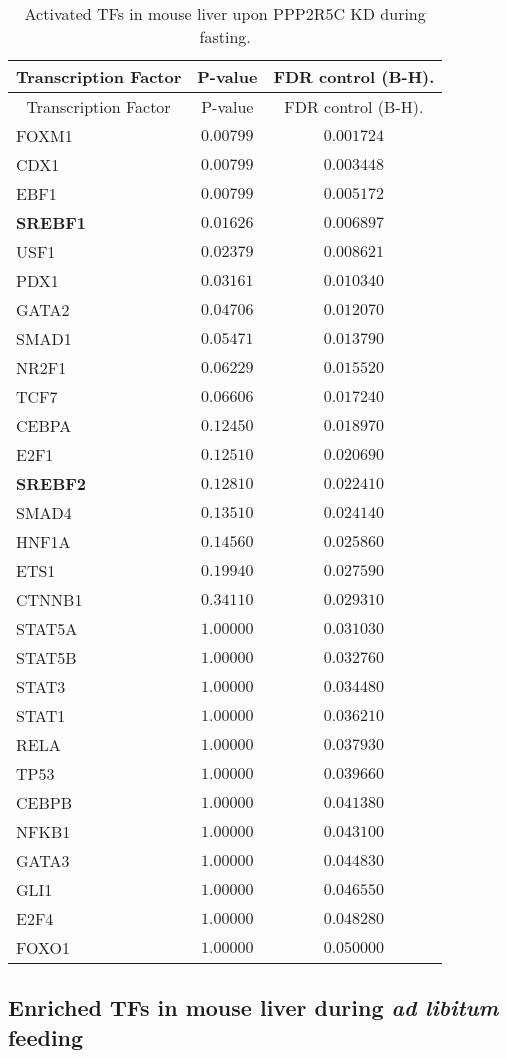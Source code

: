 \begin{longtable}{lcc}
\caption{Activated TFs in mouse liver upon PPP2R5C KD during fasting.}
\label{tab:tab2.2}
\tabularnewline
\toprule
\multicolumn{1}{c}{Transcription Factor}&\multicolumn{1}{c}{P-value}&\multicolumn{1}{c}{FDR control (B-H).}\tabularnewline
\midrule
\endfirsthead


\multicolumn{1}{c}{Transcription Factor}&\multicolumn{1}{c}{P-value}&\multicolumn{1}{c}{FDR control (B-H).}\tabularnewline
\midrule
\endhead
\hline
\endfoot
FOXM1&$0.00799$&$0.001724$\tabularnewline
CDX1&$0.00799$&$0.003448$\tabularnewline
EBF1&$0.00799$&$0.005172$\tabularnewline
\textbf{SREBF1}&$0.01626$&$0.006897$\tabularnewline
USF1&$0.02379$&$0.008621$\tabularnewline
PDX1&$0.03161$&$0.010340$\tabularnewline
GATA2&$0.04706$&$0.012070$\tabularnewline
SMAD1&$0.05471$&$0.013790$\tabularnewline
NR2F1&$0.06229$&$0.015520$\tabularnewline
TCF7&$0.06606$&$0.017240$\tabularnewline
CEBPA&$0.12450$&$0.018970$\tabularnewline
E2F1&$0.12510$&$0.020690$\tabularnewline
\textbf{SREBF2}&$0.12810$&$0.022410$\tabularnewline
SMAD4&$0.13510$&$0.024140$\tabularnewline
HNF1A&$0.14560$&$0.025860$\tabularnewline
ETS1&$0.19940$&$0.027590$\tabularnewline
CTNNB1&$0.34110$&$0.029310$\tabularnewline
STAT5A&$1.00000$&$0.031030$\tabularnewline
STAT5B&$1.00000$&$0.032760$\tabularnewline
STAT3&$1.00000$&$0.034480$\tabularnewline
STAT1&$1.00000$&$0.036210$\tabularnewline
RELA&$1.00000$&$0.037930$\tabularnewline
TP53&$1.00000$&$0.039660$\tabularnewline
CEBPB&$1.00000$&$0.041380$\tabularnewline
NFKB1&$1.00000$&$0.043100$\tabularnewline
GATA3&$1.00000$&$0.044830$\tabularnewline
GLI1&$1.00000$&$0.046550$\tabularnewline
E2F4&$1.00000$&$0.048280$\tabularnewline
FOXO1&$1.00000$&$0.050000$\tabularnewline
\bottomrule
\end{longtable}

\subsection{Enriched TFs in mouse liver during \textit{ad libitum} feeding}


